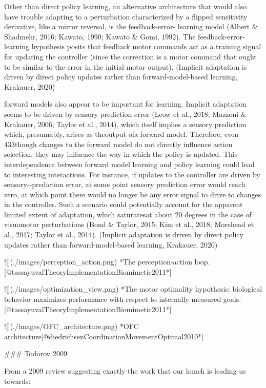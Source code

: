 \documentclass[../main.tex]{subfiles}
\begin{document}
{{Other than direct policy learning, an alternative architecture that would also have trouble adapting to a perturbation characterized by a flipped sensitivity derivative, like a mirror reversal, is the feedback-error- learning model (Albert & Shadmehr, 2016; Kawato, 1990; Kawato & Gomi, 1992). The feedback-error- learning hypothesis posits that feedback motor commands act as a training signal for updating the controller (since the correction is a motor command that ought to be similar to the error in the initial motor output). (Implicit adaptation is driven by direct policy updates rather than forward-model-based learning, Krakauer, 2020)

forward models also appear to be important for learning. Implicit adaptation seems to be driven by sensory prediction error (Leow et al., 2018; Mazzoni & Krakauer, 2006; Taylor et al., 2014), which itself implies a sensory prediction which, presumably, arises as theoutput ofa forward model. Therefore, even 433though changes to the forward model do not directly influence action selection, they may influence the way in which the policy is updated. This interdependence between forward model learning and policy learning could lead to interesting interactions. For instance, if updates to the controller are driven by sensory-­‐prediction error, at some point sensory prediction error would reach zero, at which point there would no longer be any error signal to drive to changes in the controller. Such a scenario could potentially account for the apparent limited extent of adaptation, which saturatesat about 20 degrees in the case of visuomotor perturbations (Bond & Taylor, 2015; Kim et al., 2018; Morehead et al., 2017; Taylor et al., 2014). (Implicit adaptation is driven by direct policy updates rather than forward-model-based learning, Krakauer, 2020)

![](./images/perception_action.png)
*The perception-action loop.[@tassayuvalTheoryImplementationBiomimetic2011*]

![](./images/optimization_view.png)
*The motor optimality hypothesis: biological behavior maximizes performance with respect to internally measured goals.[@tassayuvalTheoryImplementationBiomimetic2011*]

![](./images/OFC_architecture.png)
*OFC architecture[@diedrichsenCoordinationMovementOptimal2010*]


### Todorov 2009

From a 2009 review suggesting exactly the work that our hunch is leading us towards:

}}
\end{document}
